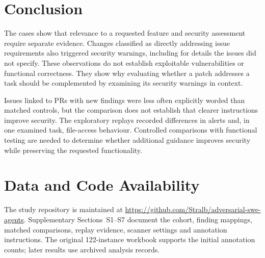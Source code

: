 \documentclass[acmsmall,screen,nonacm]{acmart}
\begin{document}
\section{Conclusion}

The cases show that relevance to a requested feature and security assessment require separate evidence. Changes classified as directly addressing issue requirements also triggered security warnings, including for details the issues did not specify. These observations do not establish exploitable vulnerabilities or functional correctness. They show why evaluating whether a patch addresses a task should be complemented by examining its security warnings in context.

Issues linked to PRs with new findings were less often explicitly worded than matched controls, but the comparison does not establish that clearer instructions improve security. The exploratory replays recorded differences in alerts and, in one examined task, file-access behaviour. Controlled comparisons with functional testing are needed to determine whether additional guidance improves security while preserving the requested functionality.

\section*{Data and Code Availability}

The study repository is maintained at \url{https://github.com/Stralb/adversarial-swe-agents}. Supplementary Sections~S1--S7 document the cohort, finding mappings, matched comparisons, replay evidence, scanner settings and annotation instructions. The original 122-instance workbook supports the initial annotation counts; later results use archived analysis records.
\end{document}
